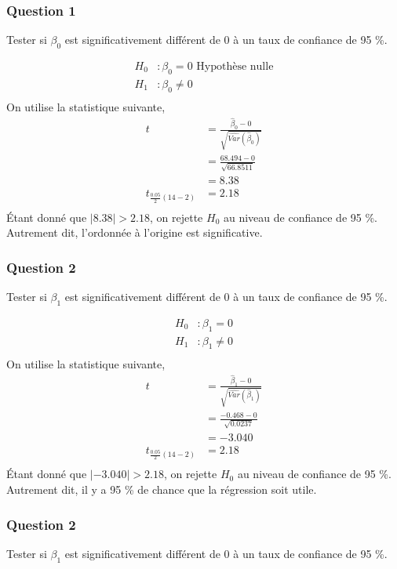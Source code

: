 \documentclass[11pt,french]{report}
\begin{document}
\subsubsection*{Question 1}
Tester si $\beta_0$ est significativement différent de 0 à un taux de confiance de 95 \%.

\begin{align*}
H_0 &: \beta_0 = 0 \text{ Hypothèse nulle} \\
H_1 &: \beta_0 \neq 0 \\
\end{align*}
On utilise la statistique suivante,
\begin{align*}
t &= \frac{\hat{\beta}_0 - 0 }{\sqrt{\widehat{Var}(\hat{\beta}_0)}} \\
&= \frac{68.494 - 0}{\sqrt{66.8511}}\\
&= 8.38\\
t_{\frac{0.05}{2}(14-2)} &= 2.18 \\
\end{align*}
Étant donné que $|8.38| > 2.18$, on rejette $H_0$ au niveau de confiance de 95 \%. Autrement dit, l'ordonnée à l'origine est significative.

\subsubsection*{Question 2}
Tester si $\beta_1$ est significativement différent de 0 à un taux de confiance de 95 \%.

\begin{align*}
H_0 &: \beta_1 = 0\\
H_1 &: \beta_1 \neq 0 \\
\end{align*}
On utilise la statistique suivante,
\begin{align*}
t &= \frac{\hat{\beta}_1 - 0 }{\sqrt{\widehat{Var}(\hat{\beta}_1)}} \\
&= \frac{-0.468 - 0}{\sqrt{0.0237}}\\
&= -3.040\\
t_{\frac{0.05}{2}(14-2)} &= 2.18\\
\end{align*}
Étant donné que $|-3.040| > 2.18$, on rejette $H_0$ au niveau de confiance de 95 \%. Autrement dit, il y a 95 \% de chance que la régression soit utile.

\subsubsection*{Question 2}
Tester si $\beta_1$ est significativement différent de 0 à un taux de confiance de 95 \%.
\end{document}
